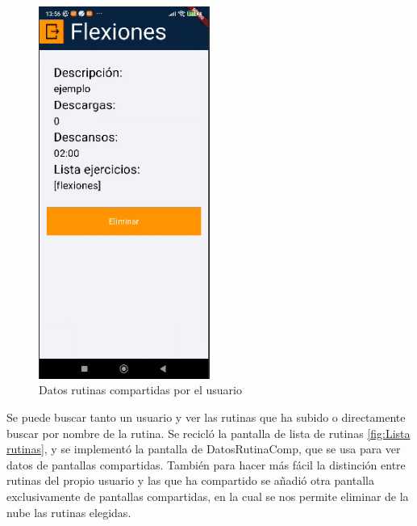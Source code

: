 \begin{figure}[H]
   \centering
    \includegraphics[width=0.5\textwidth]{pantallas/DatosMiRutinaComp.png}
    \caption{Datos rutinas compartidas por el usuario}
    \label{fig:DatosMiRutinaComp}
\end{figure}


Se puede buscar tanto un usuario y ver las rutinas que ha subido o directamente buscar por nombre de la rutina. Se recicló la pantalla de lista de rutinas \cref{fig:Lista rutinas}, y se implementó la pantalla de DatosRutinaComp, que se usa para ver datos de pantallas compartidas. También para hacer más fácil la distinción entre rutinas del propio usuario y las que ha compartido se añadió otra pantalla exclusivamente de pantallas compartidas, en la cual se nos permite eliminar de la nube las rutinas elegidas.

